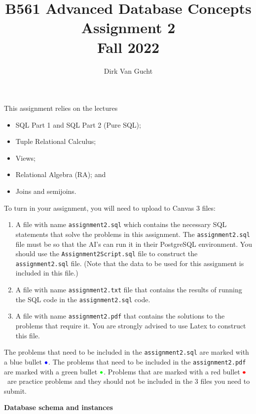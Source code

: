 \documentclass[11pt]{article}
\newcommand{\red}[1]{{\color{red}#1}}
\newcommand{\green}[1]{{\color{green}#1}}
\newcommand{\blue}[1]{{\color{blue}#1}}
\newcommand{\redbullet}{$\red{\bullet}$}
\newcommand{\greenbullet}{$\green{\bullet}$}
\newcommand{\bluebullet}{$\blue{\bullet}$}
\begin{document}
\title{B561 Advanced Database Concepts \\Assignment 2 \\Fall 2022}
\author{Dirk Van Gucht}
\date{}
\maketitle

This {assignment} relies on the lectures
\begin{itemize}
\item SQL Part 1 and SQL Part 2 (Pure SQL);
\item Tuple Relational Calculus;
\item Views;
\item Relational Algebra (RA);  and 
\item Joins and semijoins. 
\end{itemize}

To turn in your assignment, you will need to upload to Canvas 3 files:
\begin{enumerate}
\item A file with name {\tt assignment2.sql} which contains 
the necessary SQL statements that solve the problems in this assignment.   
The {\tt assignment2.sql} file must be so that the AI's can run it in their PostgreSQL environment.  You should use the {\tt Assignment2Script.sql} file to construct the {\tt assignment2.sql} file. (Note that the data to be used for this assignment is included in this file.)
\item A file with name {\tt assignment2.txt} file that contains the results of running the SQL code in the {\tt assignment2.sql} code.
\item A file with name {\tt assignment2.pdf} that contains the solutions to the problems that require it. You are strongly advised to use Latex to construct this file.
\end{enumerate}


The problems that need to be included in the {\tt assignment2.sql} are marked with a blue bullet \bluebullet.
The problems that need to be included in the {\tt assignment2.pdf} are marked with a green bullet \greenbullet.
Problems that are marked with a red bullet \redbullet\  are practice problems and they should not be included in the 3 files you need to submit.



\newpage
\noindent
\large{\bf Database schema and instances}
\bigskip
\end{document}
